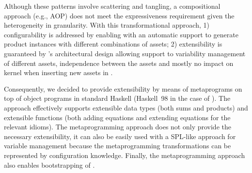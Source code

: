 Although these patterns involve scattering and tangling, a compositional approach (e.g., AOP) does not meet the expressiveness requirement given the heterogeneity in granularity. With this transformational approach, 1) configurability is addressed by enabling \hpl{} with an automatic support to generate product instances with different combinations of assets; 2) extensibility is guaranteed by \hpl{}'s architectural design allowing support to variability management of different assets, independence between the assets and mostly no impact on kernel when inserting new assets in \hpl.

Consequently, we decided to provide extensibility by means of
metaprograms on top of object programs in standard Haskell (Haskell~98
in the case of \hpl). The approach effectively supports extensible
data types (both sums and products) and extensible functions (both
adding equations and extending equations for the relevant idioms).
The metaprogramming approach does not only provide the necessary
extensibility, it can also be easily used with a SPL-like approach for
variable management because the metaprogramming transformations can be
represented by configuration knowledge. Finally, the
metaprogramming approach also enables bootstrapping of \hpl.